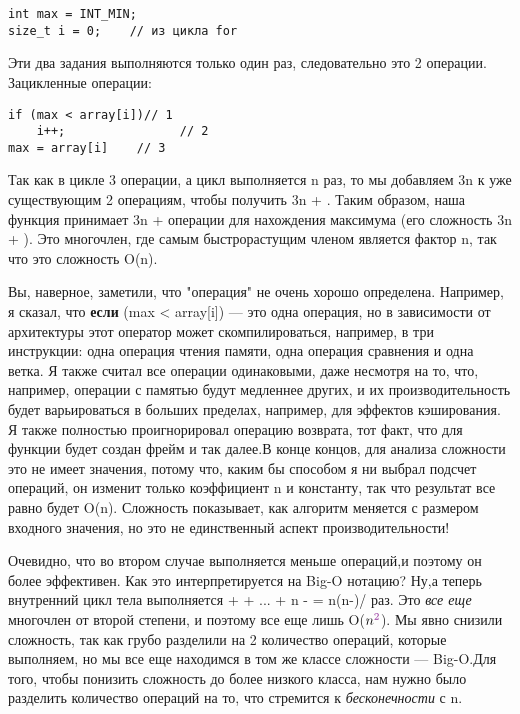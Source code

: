 \vspace{\baselineskip}
\begin{tcolorbox}
\begin{verbatim}
int max = INT_MIN;
size_t i = 0;	 // из цикла for
\end{verbatim}
\end{tcolorbox}


\vspace{\baselineskip}
Эти два задания выполняются только один раз, следовательно это 2 операции. Зацикленные операции:

\vspace{\baselineskip}
\begin{tcolorbox}
\begin{verbatim}
if (max < array[i])// 1
	i++;				// 2
max = array[i]	  // 3
\end{verbatim}
\end{tcolorbox}

\vspace{\baselineskip}
Так как в цикле 3 операции, а цикл выполняется n раз, то мы добавляем 3n к уже существующим 2 операциям, чтобы получить 3n + . Таким образом, наша функция принимает 3n +  операции для нахождения максимума (его сложность 3n + ). Это многочлен, где самым быстрорастущим членом является фактор n, так что это сложность  O(n).

\vspace{\baselineskip}
 Вы, наверное, заметили, что "операция" не очень хорошо определена. Например, я сказал, что \textbf{если} (max < array[i]) --- это одна операция, но в зависимости от архитектуры этот оператор может скомпилироваться, например, в три инструкции: одна операция чтения памяти, одна операция сравнения и одна ветка. Я также считал все операции одинаковыми, даже несмотря на то, что, например, операции с памятью будут медленнее других, и их производительность будет варьироваться в больших пределах, например, для эффектов кэширования. Я также полностью проигнорировал операцию возврата, тот факт, что для функции будет создан фрейм и так далее.В конце концов, для анализа сложности это не имеет значения, потому что, каким бы способом я ни выбрал подсчет операций, он изменит только коэффициент n и константу, так что результат все равно будет O(n). Сложность показывает, как алгоритм меняется с размером входного значения, но это не единственный аспект производительности!
 
\vspace{\baselineskip}
Очевидно, что во втором случае выполняется меньше операций,и поэтому он более эффективен. Как это интерпретируется на Big-O нотацию? Ну,а теперь внутренний цикл тела выполняется  +  + ... + n -  = n(n-)/ раз. Это \textit{все еще} многочлен от
второй степени, и поэтому все еще лишь O($n^{\p{2}}$). Мы явно снизили сложность, так как грубо разделили на
2 количество операций, которые выполняем, но мы все еще находимся в том же классе сложности --- Big-O.Для того, 
чтобы понизить сложность до более низкого класса, нам нужно было разделить количество операций на то, что
стремится к \textit{бесконечности} с n.

